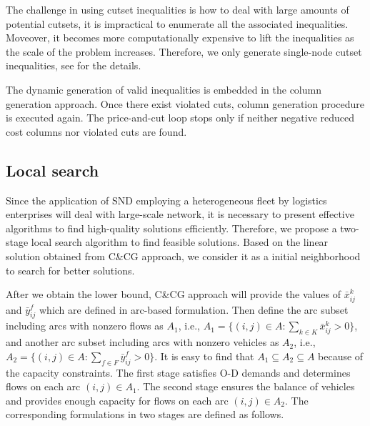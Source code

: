\documentclass[11pt,nonblindrev,fleqn]{article}
\begin{document}
The challenge in using cutset inequalities is how to deal with large amounts of potential cutsets, it is impractical to enumerate all the associated inequalities. Moveover, it becomes more computationally expensive to lift the inequalities as the scale of the problem increases. Therefore, we only generate single-node cutset inequalities, see \cite{Chouman2016Commodity} for the details.

The dynamic generation of valid inequalities is embedded in the column generation approach. Once there exist violated cuts, column generation procedure is executed again. The price-and-cut loop stops only if neither negative reduced cost columns nor violated cuts are found.

\subsection{Local search}\label{localSearch}
Since the application of SND employing a heterogeneous fleet by logistics enterprises will deal with large-scale network, it is necessary to present effective algorithms to find high-quality solutions efficiently. Therefore, we propose a two-stage local search algorithm to find feasible solutions. Based on the linear solution obtained from C\&CG approach, we consider it as a initial neighborhood to search for better solutions.

After we obtain the lower bound, C\&CG approach will provide the values of $\bar{x}_{ij}^k$ and $\bar{y}_{ij}^f$ which are defined in arc-based formulation. Then define the arc subset including arcs with nonzero flows as $A_1$, i.e., $A_1 = \{ (i,j)\in A : \sum_{k\in K} \bar{x}_{ij}^k >0 \} $, and another arc subset including arcs with nonzero vehicles as $A_2$, i.e., $A_2 =\{  (i,j)\in A : \sum_{f\in F} \bar{y}_{ij}^f >0 \}$. It is easy to find that $A_1\subseteq A_2 \subseteq A$ because of the capacity constraints. The first stage satisfies O-D demands and determines flows on each arc $(i,j)\in A_1$. The second stage ensures the balance of vehicles and provides enough capacity for flows on each arc $(i,j)\in A_2$. The corresponding formulations in two stages are defined as follows.
\end{document}
